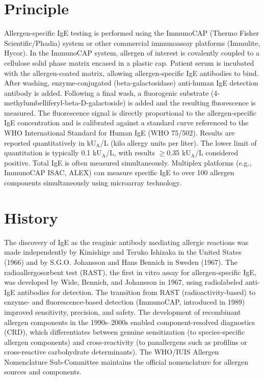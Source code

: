 \section*{Principle}
Allergen-specific IgE testing is performed using the ImmunoCAP (Thermo Fisher Scientific/Phadia) system or other commercial immunoassay platforms (Immulite, Hycor). In the ImmunoCAP system, allergen of interest is covalently coupled to a cellulose solid phase matrix encased in a plastic cap. Patient serum is incubated with the allergen-coated matrix, allowing allergen-specific IgE antibodies to bind. After washing, enzyme-conjugated (beta-galactosidase) anti-human IgE detection antibody is added. Following a final wash, a fluorogenic substrate (4-methylumbelliferyl-beta-D-galactoside) is added and the resulting fluorescence is measured. The fluorescence signal is directly proportional to the allergen-specific IgE concentration and is calibrated against a standard curve referenced to the WHO International Standard for Human IgE (WHO 75/502). Results are reported quantitatively in kU$_\text{A}$/L (kilo allergy units per liter). The lower limit of quantitation is typically 0.1 kU$_\text{A}$/L, with results $\geq$0.35 kU$_\text{A}$/L considered positive. Total IgE is often measured simultaneously. Multiplex platforms (e.g., ImmunoCAP ISAC, ALEX) can measure specific IgE to over 100 allergen components simultaneously using microarray technology.

\section*{History}
The discovery of IgE as the reaginic antibody mediating allergic reactions was made independently by Kimishige and Teruko Ishizaka in the United States (1966) and by S.G.O. Johansson and Hans Bennich in Sweden (1967). The radioallergosorbent test (RAST), the first in vitro assay for allergen-specific IgE, was developed by Wide, Bennich, and Johansson in 1967, using radiolabeled anti-IgE antibodies for detection. The transition from RAST (radioactivity-based) to enzyme- and fluorescence-based detection (ImmunoCAP, introduced in 1989) improved sensitivity, precision, and safety. The development of recombinant allergen components in the 1990s--2000s enabled component-resolved diagnostics (CRD), which differentiates between genuine sensitization (to species-specific allergen components) and cross-reactivity (to panallergens such as profilins or cross-reactive carbohydrate determinants). The WHO/IUIS Allergen Nomenclature Sub-Committee maintains the official nomenclature for allergen sources and components.

